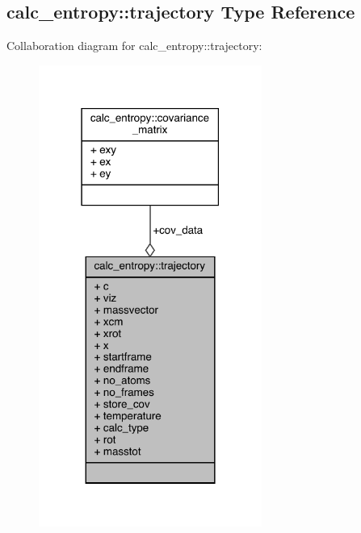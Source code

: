\hypertarget{structcalc__entropy_1_1trajectory}{\subsection{calc\-\_\-entropy\-:\-:trajectory Type Reference}
\label{structcalc__entropy_1_1trajectory}
}


Collaboration diagram for calc\-\_\-entropy\-:\-:trajectory\-:
\nopagebreak
\begin{figure}[H]
\begin{center}
\leavevmode
\includegraphics[width=207pt]{structcalc__entropy_1_1trajectory__coll__graph}
\end{center}
\end{figure}
